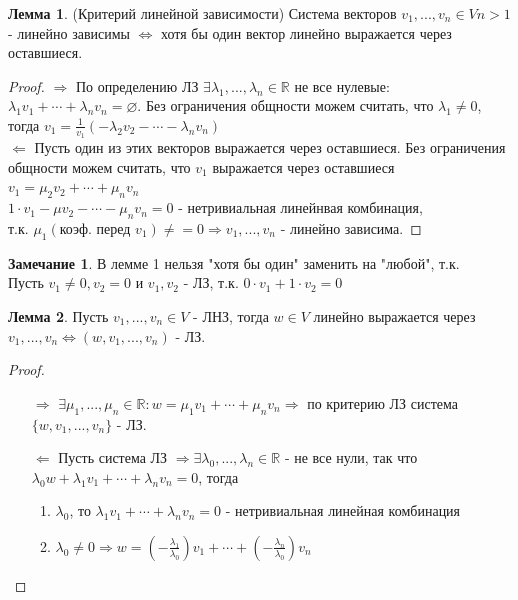 \documentclass[a4paper, 12pt]{article}
\newcommand{\R}{\mathbb R}
\theoremstyle{definition}
\newtheorem*{lemma}{Лемма}
\newtheorem*{remark}{Замечание}
\begin{document}
  \begin{lemma}
    (Критерий линейной зависимости)
    Система векторов $v_1,...,v_n \in V n>1$ - линейно зависимы $\Longleftrightarrow $ хотя бы один вектор линейно выражается через оставшиеся.  
  \end{lemma} 
  \begin{proof}
    $\Longrightarrow $ По определению ЛЗ $\exists \lambda_1,...,\lambda_n \in \R$ не все нулевые: $\lambda_1 v_1 + \cdots + \lambda_n v_n = \varnothing$. Без ограничения общности можем считать, что $\lambda_1 \neq 0$, тогда $v_1 = \frac{1}{v_1}(-\lambda_2 v_2 - \cdots - \lambda_n v_n)$  \\
    $\Longleftarrow$ Пусть один из этих векторов выражается через оставшиеся. Без ограничения общности можем считать, что $v_1$ выражается через оставшиеся \\ $v_1 = \mu_2 v_2 + \cdots + \mu_n v_n$ \\ $1 \cdot v_1 -\mu v_2 - \cdots - \mu_n v_n = 0$ - нетривиальная линейнвая комбинация, \\ т.к. $\mu_1 (\text{коэф. перед }v_1) \neq = 0 \Longrightarrow {v_1,...,v_n}$ - линейно зависима.  
  \end{proof} 
  \begin{remark}
    В лемме 1 нельзя "хотя бы один" заменить на "любой", т.к. \\
    Пусть $v_1 \neq 0, v_2 = 0$ и $v_1, v_2$ - ЛЗ, т.к. $0 \cdot v_1 + 1 \cdot v_2 = 0$
  \end{remark} 
  \begin{lemma}
    Пусть $v_1,...,v_n \in V$ - ЛНЗ, тогда $w \in V$ линейно выражается через $v_1,...,v_n \Longleftrightarrow (w,v_1,...,v_n)$ - ЛЗ.   
  \end{lemma} 
  \begin{proof}
    \begin{itemize}
      \item[$\Longrightarrow$] $\exists \mu_1,...,\mu_n \in \R: w = \mu_1 v_1 + \cdots +\mu_n v_n \Longrightarrow$ по критерию ЛЗ система $\{w,v_1,...,v_n\}$ - ЛЗ.
      \item[$\Longleftarrow$] Пусть система ЛЗ $\Longrightarrow \exists \lambda_0,...,\lambda_n \in \R$ - не все нули, так что  $\lambda_0 w + \lambda_1 v_1 + \cdots + \lambda_n v_n = 0$, тогда 
      \begin{enumerate}
        \item $ \lambda_0$, то $\lambda_1 v_1 + \cdots + \lambda_n v_n = 0$ - нетривиальная линейная комбинация
        \item $\lambda_0 \neq 0 \Longrightarrow w = (-\frac{\lambda_1}{\lambda_0})v_1 + \cdots + (-\frac{\lambda_n}{\lambda_0})v_n$
      \end{enumerate} 
    \end{itemize}
  \end{proof} 
\end{document}

